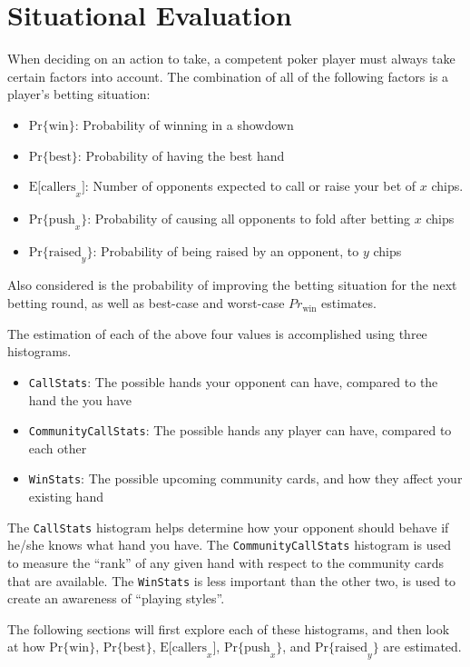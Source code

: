 


\chapter{Situational Evaluation}
\label{sec:SituationalEvaluation}

When deciding on an action to take, a competent poker player must always take certain factors into account.
The combination of all of the following factors is a player's betting situation:
\begin{itemize}
\singlespacing
\item $\mathrm{Pr\{win\}}$: Probability of winning in a showdown
\item $\mathrm{Pr\{best\}}$: Probability of having the best hand
\item $\mathrm{E[callers}_x]$: Number of opponents expected to call or raise your bet of $x$ chips.
\item $\mathrm{Pr\{push}_x\}$: Probability of causing all opponents to fold after betting $x$ chips
\item $\mathrm{Pr\{raised}_y\}$: Probability of being raised by an opponent, to $y$ chips
\end{itemize}
Also considered is the probability of improving the betting situation for the next betting round, as well as best-case and worst-case $Pr_{\mathrm{win}}$ estimates.

The estimation of each of the above four values is accomplished using three histograms.
\begin{itemize}
\singlespacing
\item \texttt{CallStats}: The possible hands your opponent can have, compared to the hand the you have
\item \texttt{CommunityCallStats}: The possible hands any player can have, compared to each other
\item \texttt{WinStats}: The possible upcoming community cards, and how they affect your existing hand
\end{itemize}
The \texttt{CallStats} histogram helps determine how your opponent should behave if he/she knows what hand you have.
The \texttt{CommunityCallStats} histogram is used to measure the ``rank'' of any given hand with respect to the community cards that are available.
The \texttt{WinStats} is less important than the other two, is used to create an awareness of ``playing styles''.

The following sections will first explore each of these histograms, and then look at how $\mathrm{Pr\{win\}}$, $\mathrm{Pr\{best\}}$, $\mathrm{E[callers}_x]$, $\mathrm{Pr\{push}_x\}$, and $\mathrm{Pr\{raised}_y\}$ are estimated.

